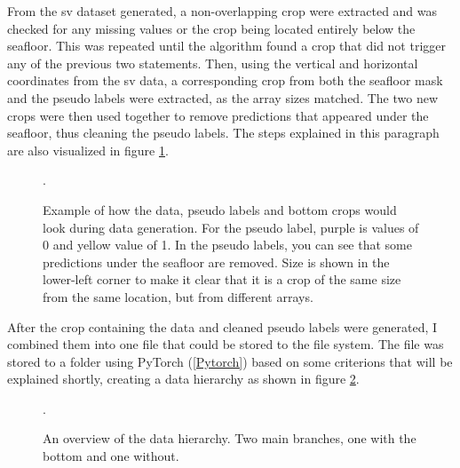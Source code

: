         From the \gls{sv} dataset generated, a non-overlapping crop were extracted and was checked for any missing values or the crop being located entirely below the seafloor. This was repeated until the algorithm found a crop that did not trigger any of the previous two statements. Then, using the vertical and horizontal coordinates from the \gls{sv} data, a corresponding crop from both the seafloor mask and the pseudo labels were extracted, as the array sizes matched. The two new crops were then used together to remove predictions that appeared under the seafloor, thus cleaning the pseudo labels. The steps explained in this paragraph are also visualized in figure \ref{crop_extract_fig}.
        \clearpage
        \begin{figure}[H]
            \centering
            
            \caption[Data, label and bottom crop extraction and interaction]{Example of how the data, pseudo labels and bottom crops would look during data generation. For the pseudo label, purple is values of 0 and yellow value of 1. In the pseudo labels, you can see that some predictions under the seafloor are removed.  Size is shown in the lower-left corner to make it clear that it is a crop of the same size from the same location, but from different arrays.}.
          	\medskip 
            \label{crop_extract_fig}
        \end{figure}
        
        After the crop containing the data and cleaned pseudo labels were generated, I combined them into one file that could be stored to the file system. The file was stored to a folder using PyTorch (\ref{Pytorch}) based on some criterions that will be explained shortly, creating a data hierarchy as shown in figure \ref{data_hierarchy_fig}.
        
        
        \begin{figure}[H]
            \centering
            
            \caption[The data-hierarchy]{An overview of the data hierarchy. Two main branches, one with the bottom and one without.}.
          	\medskip 
            \label{data_hierarchy_fig}
        \end{figure}
        
